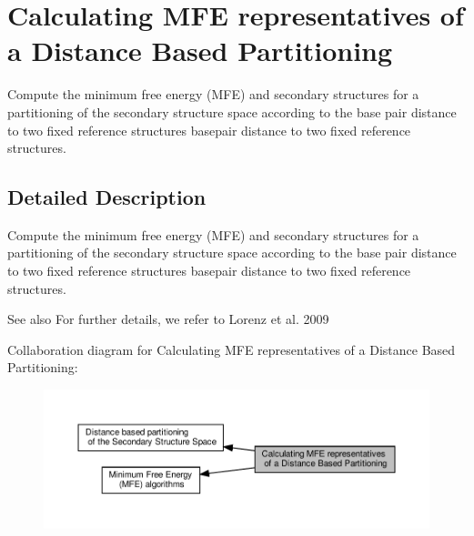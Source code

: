 \hypertarget{group__kl__neighborhood__mfe}{}\section{Calculating M\+FE representatives of a Distance Based Partitioning}
\label{group__kl__neighborhood__mfe}


Compute the minimum free energy (M\+FE) and secondary structures for a partitioning of the secondary structure space according to the base pair distance to two fixed reference structures basepair distance to two fixed reference structures.  




\subsection{Detailed Description}
Compute the minimum free energy (M\+FE) and secondary structures for a partitioning of the secondary structure space according to the base pair distance to two fixed reference structures basepair distance to two fixed reference structures. 

\begin{DoxySeeAlso}{See also}
For further details, we refer to Lorenz et al. 2009 \cite{lorenz:2009} 
\end{DoxySeeAlso}
Collaboration diagram for Calculating M\+FE representatives of a Distance Based Partitioning\+:
\nopagebreak
\begin{figure}[H]
\begin{center}
\leavevmode
\includegraphics[width=350pt]{group__kl__neighborhood__mfe}
\end{center}
\end{figure}
